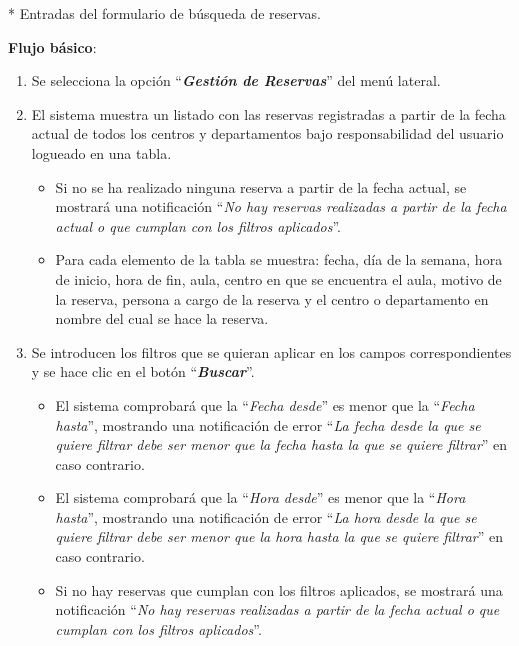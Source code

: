 * Entradas del formulario de búsqueda de reservas.

\textbf{Flujo básico}:
    \begin{enumerate}
        \item Se selecciona la opción ``\textbf{\textit{Gestión de Reservas}}'' del menú lateral.
        
        \item El sistema muestra un listado con las reservas registradas a partir de la fecha actual de todos los centros y departamentos bajo responsabilidad del usuario logueado en una tabla.
        
            \begin{itemize}
            \tightlist
                \item Si no se ha realizado ninguna reserva a partir de la fecha actual, se mostrará una notificación ``\textit{No hay reservas realizadas a partir de la fecha actual o que cumplan con los filtros aplicados}''.
                
                \item  Para cada elemento de la tabla se muestra: fecha, día de la semana, hora de inicio, hora de fin, aula, centro en que se encuentra el aula, motivo de la reserva, persona a cargo de la reserva y el centro o departamento en nombre del cual se hace la reserva.
            \end{itemize}
        
        \item Se introducen los filtros que se quieran aplicar en los campos correspondientes y se hace clic en el botón ``\textbf{\textit{Buscar}}''.
        
            \begin{itemize}
            \tightlist
                \item El sistema comprobará que la ``\textit{Fecha desde}'' es menor que la ``\textit{Fecha hasta}'', mostrando una notificación de error ``\textit{La fecha desde la que se quiere filtrar debe ser menor que la fecha hasta la que se quiere filtrar}'' en caso contrario.
                
                \item El sistema comprobará que la ``\textit{Hora desde}'' es menor que la ``\textit{Hora hasta}'', mostrando una notificación de error ``\textit{La hora desde la que se quiere filtrar debe ser menor que la hora hasta la que se quiere filtrar}'' en caso contrario.
                
                \item Si no hay reservas que cumplan con los filtros aplicados, se mostrará una notificación ``\textit{No hay reservas realizadas a partir de la fecha actual o que cumplan con los filtros aplicados}''.
            \end{itemize}
            

\end{enumerate}
